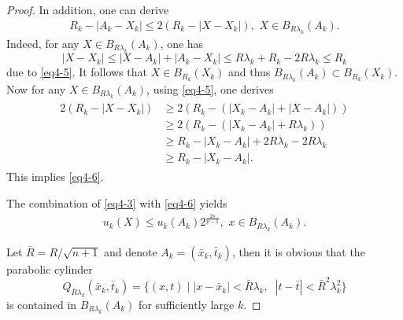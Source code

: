 \documentclass[12pt]{article}
\theoremstyle{remark}
\numberwithin{equation}{section}
\begin{document}
\begin{proof}
In addition, one can derive
\begin{eqnarray}\label{eq4-6}
R_k-|A_k-X_k|\leq 2(R_k-|X-X_k|),\,\, X\in B_{R \lambda_k}(A_k).
\end{eqnarray}
Indeed, for any $X \in B_{R \lambda_k}(A_k)$, one has
$$
|X-X_k|\leq |X-A_k|+|A_k-X_k|\leq R\lambda_k +R_k-2R\lambda_k \leq R_k
$$
due to \eqref{eq4-5}. It follows that  $X\in B_{R_k}(X_k)$
and thus
$B_{R\lambda_k}(A_k)\subset B_{R_k}(X_k).$ Now for any $X\in B_{R\lambda_k}(A_k)$, using \eqref{eq4-5}, one derives
\begin{eqnarray*}
\begin{aligned}
	2(R_k-|X-X_k|)&\geq 2(R_k-(|X_k-A_k|+|X-A_k|))\\
	&\geq 2(R_k -(|X_k-A_k|+R\lambda_k))\\
	&\geq R_k -|X_k-A_k|+2R\lambda_k-2R\lambda_k\\
	&\geq R_k -|X_k-A_k|.
\end{aligned}
\end{eqnarray*}
This implies \eqref{eq4-6}.

The combination of  \eqref{eq4-3} with \eqref{eq4-6} yields
\begin{eqnarray}\label{eq4-7}
u_k(X)\leq u_k(A_k) 2^\frac{2s}{p-1},\,\, x\in B_{R \lambda_k}(A_k).
\end{eqnarray}

Let $\bar{R} = R/\sqrt{n+1}$ and denote $A_k = (\bar{x}_k, \bar{t}_k)$,  then it is obvious that the parabolic cylinder
$$ Q_{\bar{R} \lambda_k}(\bar{x}_k, \bar{t}_k)  = \{(x,t) \mid |x-\bar{x}_k| < \bar{R} \lambda_k, \;\; |t-\bar{t}|< \bar{R}^2 \lambda_k^2 \}$$ is contained in
$B_{R\lambda_k}(A_k)$ for sufficiently large $k$.


\end{proof}
\end{document}
